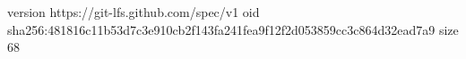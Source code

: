 version https://git-lfs.github.com/spec/v1
oid sha256:481816c11b53d7c3e910cb2f143fa241fea9f12f2d053859cc3c864d32ead7a9
size 68

